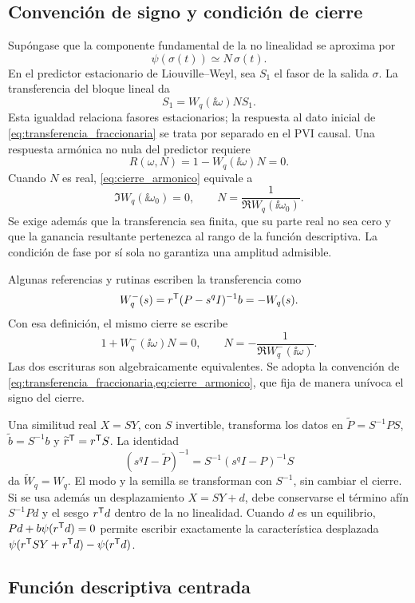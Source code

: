 \subsection{Convención de signo y condición de cierre}

Supóngase que la componente fundamental de la no linealidad se aproxima por
\[
\psi(\sigma(t))\simeq N\,\sigma(t).
\]
En el predictor estacionario de Liouville--Weyl, sea \(S_1\) el fasor de
la salida \(\sigma\). La transferencia del bloque lineal da
\[
S_1=W_q(\ii\omega)N S_1.
\]
Esta igualdad relaciona fasores estacionarios; la respuesta al dato inicial
de \cref{eq:transferencia_fraccionaria} se trata por separado en el PVI
causal. Una respuesta armónica no nula del predictor requiere
\begin{equation}
R(\omega,N)
=1-W_q(\ii\omega)N=0.
\label{eq:cierre_armonico}
\end{equation}
Cuando \(N\) es real, \cref{eq:cierre_armonico} equivale a
\begin{equation}
\Im W_q(\ii\omega_0)=0,\qquad
N=\frac{1}{\Re W_q(\ii\omega_0)}.
\label{eq:condiciones_fase_ganancia}
\end{equation}
Se exige además que la transferencia sea finita, que su parte real no sea
cero y que la ganancia resultante pertenezca al rango de la función
descriptiva. La condición de fase por sí sola no garantiza una amplitud
admisible.

Algunas referencias y rutinas escriben la transferencia como
\[
W_q^{-}(s)=r^{\mathsf T}(P-s^qI)^{-1}b=-W_q(s).
\]
Con esa definición, el mismo cierre se escribe
\[
1+W_q^{-}(\ii\omega)N=0,\qquad
N=-\frac{1}{\Re W_q^{-}(\ii\omega)}.
\]
Las dos escrituras son algebraicamente equivalentes. Se adopta la convención de
\cref{eq:transferencia_fraccionaria,eq:cierre_armonico}, que fija de manera
unívoca el signo del cierre.

Una similitud real \(X=SY\), con \(S\) invertible, transforma los datos
en \(\widetilde P=S^{-1}PS\), \(\widetilde b=S^{-1}b\) y
\(\widetilde r^{\mathsf T}=r^{\mathsf T}S\). La identidad
\[
 (s^qI-\widetilde P)^{-1}=S^{-1}(s^qI-P)^{-1}S
\]
da \(\widetilde W_q=W_q\). El modo y la semilla se transforman con
\(S^{-1}\), sin cambiar el cierre. Si se usa además un desplazamiento
\(X=SY+d\), debe conservarse el término afín \(S^{-1}Pd\) y el
sesgo \(r^{\mathsf T}d\) dentro de la no linealidad. Cuando \(d\) es un
equilibrio, \(Pd+b\psi(r^{\mathsf T}d)=0\) permite escribir exactamente
la característica desplazada
\(\psi(r^{\mathsf T}SY+r^{\mathsf T}d)-\psi(r^{\mathsf T}d)\).

\subsection{Función descriptiva centrada}

